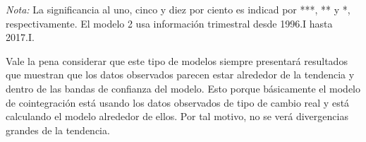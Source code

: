 \documentclass[12pt,letterpaper]{article}
\begin{document}
\begin{table}
\begin{center}
\caption{Modelos de cointegración}
\end{center}
\begin{scriptsize}
\emph{Nota:} La significancia al uno, cinco y diez por ciento es indicad por ***, ** y *, respectivamente. El modelo 2 usa información trimestral desde 1996.I hasta 2017.I.
\end{scriptsize}								
\end{table}	

Vale la pena considerar que este tipo de modelos siempre presentará resultados que muestran que los datos observados parecen estar alrededor de la tendencia y dentro de las bandas de confianza del modelo. Esto porque básicamente el modelo de cointegración está usando los datos observados de tipo de cambio real y está calculando el modelo alrededor de ellos. Por tal motivo, no se verá divergencias grandes de la tendencia.
\end{document}
